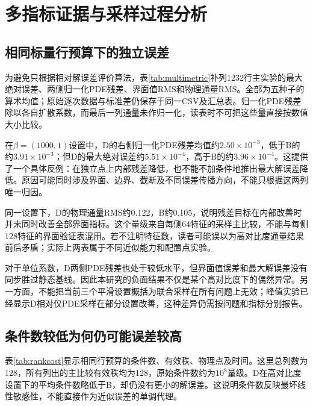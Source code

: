 \section{多指标证据与采样过程分析}
\subsection{相同标量行预算下的独立误差}
为避免只根据相对解误差评价算法，表\ref{tab:multimetric}补列1232行主实验的最大绝对误差、两侧归一化PDE残差、界面值RMS和物理通量RMS。全部为五种子的算术均值；原始逐次数据与标准差仍保存于同一CSV及汇总表。归一化PDE残差除以各自扩散系数，而最后一列通量未作归一化，读表时不可把这些量直接按数值大小比较。
\begin{table}[p]\centering
\caption{相同1232行预算下的独立多指标均值；每侧64特征、scale2、三轮}\label{tab:multimetric}
\resizebox{\textwidth}{!}{}
\end{table}

在$\beta=(1000,1)$设置中，D的右侧归一化PDE残差均值约$2.50\times10^{-3}$，低于B的约$3.91\times10^{-3}$；但D的最大绝对误差约$5.51\times10^{-4}$，高于B的约$3.96\times10^{-4}$。这提供了一个具体反例：在独立点上内部残差降低，也不能不加条件地推出最大解误差降低。原因可能同时涉及界面、边界、截断及不同误差传播方向，不能只根据这两列唯一归因。

同一设置下，D的物理通量RMS约0.122，B约0.105，说明残差目标在内部改善时并未同时改善全部界面指标。这个量级来自每侧64特征的采样主比较，不能与每侧128特征的界面验证表混用。若不注明特征数，读者可能误以为高对比度通量结果前后矛盾；实际上两表属于不同近似能力和配置点实验。

对于单位系数，D两侧PDE残差也处于较低水平，但界面值误差和最大解误差没有同步胜过静态基线。因此本研究的负面结果不仅是某个高对比度下的偶然异常。另一方面，不能把当前三个平滑设置概括为联合采样在所有问题上无效；峰值实验已经显示D相对仅PDE采样在部分设置改善，这种差异仍需按问题和指标分别报告。

\subsection{条件数较低为何仍可能误差较高}
表\ref{tab:rankcost}显示相同行预算的条件数、有效秩、物理点及时间。这里总列数为128，所有列出的主比较有效秩均为128，原始条件数约为$10^8$量级。D在高对比度设置下的平均条件数略低于B，却仍没有更小的解误差。这说明条件数反映最坏线性敏感性，不能直接作为近似误差的单调代理。
\begin{table}[p]\centering
\caption{1232行主比较的矩阵与资源诊断，五种子；时间含完整自适应过程}\label{tab:rankcost}
\resizebox{\textwidth}{!}{}
\end{table}

